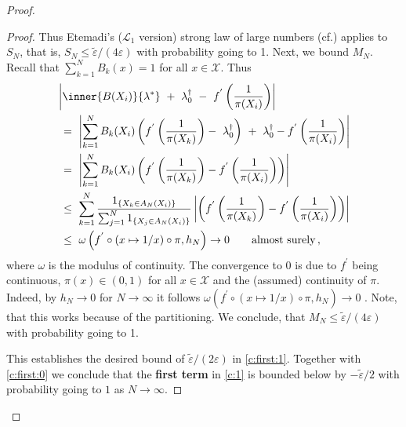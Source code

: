 \begin{proof}
\begin{proof}
Thus Etemadi's ($\mathcal{L}_1$ version) strong law of large numbers (cf.\cite[Theorem~5.17]{Klenke2020}) applies
to $S_N$, that is,
$S_N \le 
\tilde{\varepsilon}
/
(4\varepsilon)
$
with probability going to 1.
Next, we bound $M_N$.
Recall that $\sum_{k=1}^{N}B_k(x)=1$ for all $x\in\mathcal{X}$. Thus
\begin{align*}
  &
\left| 
        \inner
       {B(X_i)}
       {\lambda^*}
      \ 
       +
      \ 
      \lambda^\dagger_0
      \ 
        -
        \ 
        f^{'}
        \left( 
          \frac{1}{\pi(X_i)}
     \right)
\right|
      \\
      &
      \ 
      =
      \ 
      \left| 
      \sum_{k=1}^{N} 
      B_k(X_i)
      \left( 
        f^{'}
        \left( 
          \frac{1}{\pi(X_k)}
     \right)
  -
  \ 
  \lambda_0^\dagger
      \right)
      \ 
      +
      \ 
      \lambda_0^\dagger
      -
        f^{'}
        \left( 
          \frac{1}{\pi(X_i)}
     \right)
      \right|
      \\
      &
      \ 
      =
      \ 
      \left| 
      \sum_{k=1}^{N} 
      B_k(X_i)
      \left( 
        f^{'}
        \left( 
          \frac{1}{\pi(X_k)}
     \right)
     -
        f^{'}
        \left( 
          \frac{1}{\pi(X_i)}
     \right)
      \right)
      \right|
      \\
      &
      \ 
      \le
      \ 
      \sum_{k=1}^{N} 
      \frac{1_{\left\{ X_k\in A_N(X_i) \right\}}}
      {
        \sum_{j=1}^{N} 
1_{\left\{ X_j\in A_N(X_i) \right\}}
      }
      \left| 
      \left( 
        f^{'}
        \left( 
          \frac{1}{\pi(X_k)}
     \right)
     -
        f^{'}
        \left( 
          \frac{1}{\pi(X_i)}
     \right)
      \right)
      \right|
      \\
      &
      \ 
      \le
      \ 
      \omega
      \left( f^{'}\circ (x\mapsto1/x)\circ \pi,h_N \right)
      \to
      0
      \qquad
      \text{almost surely}
      \,,
\end{align*}
where $\omega$ is the modulus of continuity.
The convergence to 0 is due to $f^{'}$ being continuous, $\pi(x)\in(0,1)$ for all $x\in\mathcal{X}$ and the (assumed) continuity of $\pi$.
Indeed, by $h_N\to 0$ for $N\to\infty$ it follows
$
      \omega
      \left( f^{'}\circ (x\mapsto1/x)\circ \pi,h_N \right)
      \to
      0
$
.
Note, that this works because of the partitioning.
We conclude, that $
M_N\le
\tilde{\varepsilon}
/
(4\varepsilon)
$
with probability going to 1.

This establishes the desired bound of 
$
\tilde{\varepsilon}/(2\varepsilon)
$
in \eqref{c:first:1}.
Together with \eqref{c:first:0}
we conclude that the \textbf{first term} 
in
\eqref{c:1}
is bounded below by
$
-
\tilde{\varepsilon}/2
$
with probability going to $1$ as $N\to\infty$.

\end{proof}
\end{proof}

